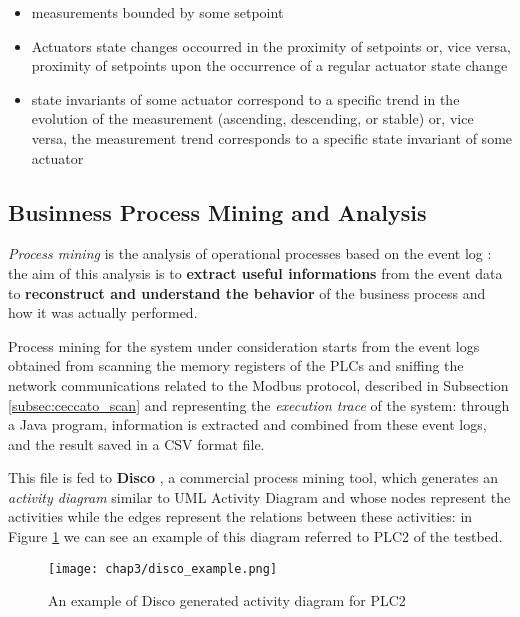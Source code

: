 \begin{itemize}
	\item measurements bounded by some setpoint
	
	\item Actuators state changes occourred in the proximity of setpoints or, vice versa, proximity of setpoints upon the occurrence of a regular actuator state change
	
	\item state invariants of some actuator correspond to a specific trend in the evolution of the measurement (ascending, descending, or stable) or, vice versa, the measurement trend corresponds to a specific state invariant of some actuator
\end{itemize}
\vfill

\subsection{Businness Process Mining and Analysis}
\label{subsec:ceccato_businessprocess}
\textit{Process mining} is the analysis of operational processes based on the event log \cite{process_mining_def}: the aim of this analysis is to \textbf{extract useful informations} from the event data to \textbf{reconstruct and understand the behavior} of the business process and how it was actually performed.

\bigskip
Process mining for the system under consideration starts from the event logs obtained from scanning the memory registers of the PLCs and sniffing the network communications related to the Modbus protocol, described in Subsection \ref{subsec:ceccato_scan} and representing the \textit{execution trace} of the system: through a Java program, information is extracted and combined from these event logs, and the result saved in a CSV format file.

This file is fed to \textbf{Disco} \cite{disco}, a commercial process mining tool, which generates an \textit{activity diagram} similar to UML Activity Diagram and whose nodes represent the activities while the edges represent the relations between these activities: in Figure \ref{fig:disco_example} we can see an example of this diagram referred to PLC2 of the testbed.

\begin{figure}[ht]
	\centering
	\texttt{[image: chap3/disco\_example.png]}
	\caption{An example of Disco generated activity diagram for PLC2}
	\label{fig:disco_example}
\end{figure}

